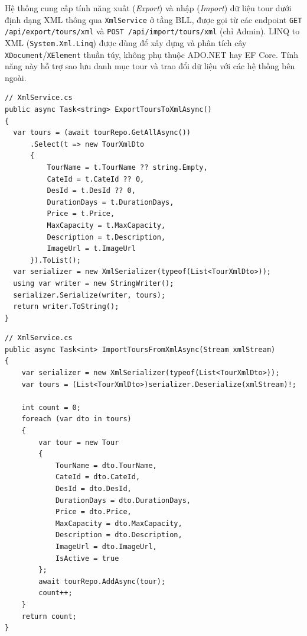 \begin{ex}\label{ex4.1}

  Hệ thống cung cấp tính năng xuất (\emph{Export}) và nhập (\emph{Import})
  dữ liệu tour dưới định dạng XML thông qua \texttt{XmlService} ở tầng BLL,
  được gọi từ các endpoint \texttt{GET /api/export/tours/xml} và
  \texttt{POST /api/import/tours/xml} (chỉ Admin).
  LINQ to XML (\texttt{System.Xml.Linq}) được dùng để xây dựng và phân tích
  cây \texttt{XDocument}/\texttt{XElement} thuần túy, không phụ thuộc ADO.NET hay EF Core.
  Tính năng này hỗ trợ sao lưu danh mục tour và trao đổi dữ liệu
  với các hệ thống bên ngoài.
\end{ex}

\begin{lstlisting}[style=csharp, caption={Export dữ liệu ra XML dùng LINQ to XML}]
// XmlService.cs
public async Task<string> ExportToursToXmlAsync()
{
  var tours = (await tourRepo.GetAllAsync())
      .Select(t => new TourXmlDto
      {
          TourName = t.TourName ?? string.Empty,
          CateId = t.CateId ?? 0,
          DesId = t.DesId ?? 0,
          DurationDays = t.DurationDays,
          Price = t.Price,
          MaxCapacity = t.MaxCapacity,
          Description = t.Description,
          ImageUrl = t.ImageUrl
      }).ToList();
  var serializer = new XmlSerializer(typeof(List<TourXmlDto>));
  using var writer = new StringWriter();
  serializer.Serialize(writer, tours);
  return writer.ToString();
}
\end{lstlisting}

\begin{lstlisting}[style=csharp, caption={Import dữ liệu từ XML}]
// XmlService.cs
public async Task<int> ImportToursFromXmlAsync(Stream xmlStream)
{
    var serializer = new XmlSerializer(typeof(List<TourXmlDto>));
    var tours = (List<TourXmlDto>)serializer.Deserialize(xmlStream)!;

    int count = 0;
    foreach (var dto in tours)
    {
        var tour = new Tour
        {
            TourName = dto.TourName,
            CateId = dto.CateId,
            DesId = dto.DesId,
            DurationDays = dto.DurationDays,
            Price = dto.Price,
            MaxCapacity = dto.MaxCapacity,
            Description = dto.Description,
            ImageUrl = dto.ImageUrl,
            IsActive = true
        };
        await tourRepo.AddAsync(tour);
        count++;
    }
    return count;
}
\end{lstlisting}


